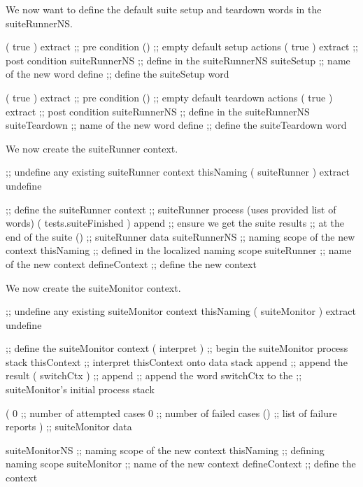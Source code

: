 We now want to define the default suite setup and teardown words in the 
suiteRunnerNS. 

\startJoylolCode
  ( { true } ) extract ;; pre condition
  ()            ;; empty default setup actions
  ( { true } ) extract ;; post condition
  suiteRunnerNS ;; define in the suiteRunnerNS
  suiteSetup    ;; name of the new word
  define        ;; define the suiteSetup word
\stopJoylolCode

\startJoylolCode
  ( { true } ) extract ;; pre condition
  ()            ;; empty default teardown actions
  ( { true } ) extract ;; post condition
  suiteRunnerNS ;; define in the suiteRunnerNS
  suiteTeardown ;; name of the new word
  define        ;; define the suiteTeardown word
\stopJoylolCode

We now create the suiteRunner context.

\startJoylolCode
  ;; undefine any existing suiteRunner context
  thisNaming
  ( suiteRunner ) extract
  undefine

  ;; define the suiteRunner context
                ;; suiteRunner process (uses provided list of words)
  ( tests.suiteFinished )
  append        ;; ensure we get the suite results
                ;; at the end of the suite
  ()            ;; suiteRunner data
  suiteRunnerNS ;; naming scope of the new context
  thisNaming    ;; defined in the localized naming scope
  suiteRunner   ;; name of the new context
  defineContext ;; define the new context
\stopJoylolCode

We now create the suiteMonitor context.

\startJoylolCode
  ;; undefine any existing suiteMonitor context
  thisNaming
  ( suiteMonitor ) extract
  undefine

  ;; define the suiteMonitor context
  ( interpret )   ;; begin the suiteMonitor process stack
  thisContext     ;; interpret thisContext onto data stack
  append          ;; append the result
  ( switchCtx )   ;;
  append          ;; append the word switchCtx to the 
                  ;; suiteMonitor's initial process stack
  
  (
    0             ;; number of attempted cases
    0             ;; number of failed cases
    ()            ;; list of failure reports
  )               ;; suiteMonitor data
  
  suiteMonitorNS  ;; naming scope of the new context
  thisNaming      ;; defining naming scope
  suiteMonitor    ;; name of the new context
  defineContext   ;; define the context
\stopJoylolCode

